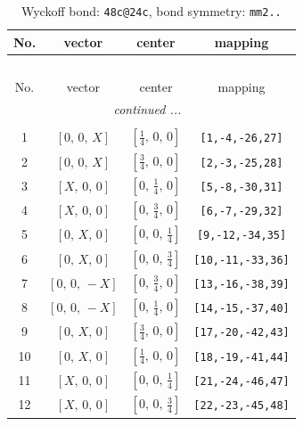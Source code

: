 \documentclass[fleqn,8pt]{jsarticle}
\begin{document}
\renewcommand{\arraystretch}{1.2}
\begin{longtable}{cccc}
\caption{Wyckoff bond: {\tt 48c@24c}, bond symmetry: {\tt mm2..}}
 \\
 \hline \hline
No. & vector & center & mapping \\ \hline \endfirsthead

\multicolumn{3}{l}{\tablename\ \thetable{}} \\
 \hline \hline
No. & vector & center & mapping \\ \hline \endhead

 \hline \hline
\multicolumn{3}{r}{\footnotesize\it continued ...} \\ \endfoot

 \hline \hline
\multicolumn{3}{r}{} \\ \endlastfoot

1 & $\left[ 0,\, 0,\, X \right]$ & $\left[ \frac{1}{4},\, 0,\, 0 \right]$ & {\tt [1,-4,-26,27]} \\ \hline
2 & $\left[ 0,\, 0,\, X \right]$ & $\left[ \frac{3}{4},\, 0,\, 0 \right]$ & {\tt [2,-3,-25,28]} \\ \hline
3 & $\left[ X,\, 0,\, 0 \right]$ & $\left[ 0,\, \frac{1}{4},\, 0 \right]$ & {\tt [5,-8,-30,31]} \\ \hline
4 & $\left[ X,\, 0,\, 0 \right]$ & $\left[ 0,\, \frac{3}{4},\, 0 \right]$ & {\tt [6,-7,-29,32]} \\ \hline
5 & $\left[ 0,\, X,\, 0 \right]$ & $\left[ 0,\, 0,\, \frac{1}{4} \right]$ & {\tt [9,-12,-34,35]} \\ \hline
6 & $\left[ 0,\, X,\, 0 \right]$ & $\left[ 0,\, 0,\, \frac{3}{4} \right]$ & {\tt [10,-11,-33,36]} \\ \hline
7 & $\left[ 0,\, 0,\, - X \right]$ & $\left[ 0,\, \frac{3}{4},\, 0 \right]$ & {\tt [13,-16,-38,39]} \\ \hline
8 & $\left[ 0,\, 0,\, - X \right]$ & $\left[ 0,\, \frac{1}{4},\, 0 \right]$ & {\tt [14,-15,-37,40]} \\ \hline
9 & $\left[ 0,\, X,\, 0 \right]$ & $\left[ \frac{3}{4},\, 0,\, 0 \right]$ & {\tt [17,-20,-42,43]} \\ \hline
10 & $\left[ 0,\, X,\, 0 \right]$ & $\left[ \frac{1}{4},\, 0,\, 0 \right]$ & {\tt [18,-19,-41,44]} \\ \hline
11 & $\left[ X,\, 0,\, 0 \right]$ & $\left[ 0,\, 0,\, \frac{1}{4} \right]$ & {\tt [21,-24,-46,47]} \\ \hline
12 & $\left[ X,\, 0,\, 0 \right]$ & $\left[ 0,\, 0,\, \frac{3}{4} \right]$ & {\tt [22,-23,-45,48]} \\
\end{longtable}
\end{document}
